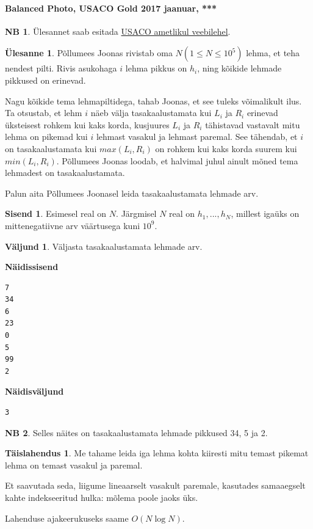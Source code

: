 \documentclass{trkut}
\theoremstyle{definition}
\newtheorem*{extra}{NB}
\newtheorem*{solution}{Täislahendus}
\newtheorem*{Input}{Sisend}
\newtheorem*{Output}{Väljund}
\newtheorem*{Text}{Ülesanne}
\begin{document}
\paragraph{Balanced Photo, USACO Gold 2017 jaanuar, ***}
\begin{extra}
Ülesannet saab esitada \href{http://www.usaco.org/index.php?page=viewproblem2&cpid=693}{USACO ametlikul veebilehel}.
\end{extra}
\begin{Text}
Põllumees Joonas rivistab oma $N$$(1\le N\le 10^5)$ lehma, et teha nendest pilti. Rivis asukohaga $i$ lehma pikkus on $h_i$, ning kõikide lehmade pikkused on erinevad.

Nagu kõikide tema lehmapiltidega, tahab Joonas, et see tuleks võimalikult ilus. Ta otsustab, et lehm $i$ näeb välja tasakaalustamata kui $L_i$ ja $R_i$ erinevad üksteisest rohkem kui kaks korda, kusjuures $L_i$ ja $R_i$ tähistavad vastavalt mitu lehma on pikemad kui $i$  lehmast vasakul ja lehmast paremal. See tähendab, et $i$ on tasakaalustamata kui $max(L_i,R_i)$ on rohkem kui kaks korda suurem kui $min(L_i, R_i)$.  Põllumees Joonas loodab, et halvimal juhul ainult mõned tema lehmadest on tasakaalustamata.

Palun aita Põllumees Joonasel leida tasakaalustamata lehmade arv.

\parencite{25}
\end{Text}
\begin{Input}
Esimesel real on $N$. Järgmisel $N$ real on $h_1,...,h_N$, millest igaüks on mittenegatiivne arv väärtusega kuni $10^9$.
\end{Input}
\begin{Output}
Väljasta tasakaalustamata lehmade arv.
\end{Output}

\textbf{Näidissisend}

\begin{verbatim}
7
34
6
23
0
5
99
2
\end{verbatim}

\textbf{Näidisväljund}

\begin{verbatim}
3
\end{verbatim}

\begin{extra}
Selles näites on tasakaalustamata lehmade pikkused 34, 5 ja 2.
\end{extra}

\begin{solution}
Me tahame leida iga lehma kohta kiiresti mitu temast pikemat lehma on temast vasakul ja paremal.

Et saavutada seda, liigume lineaarselt vasakult paremale, kasutades samaaegselt kahte indekseeritud hulka: mõlema poole jaoks üks.

Lahenduse ajakeerukuseks saame $O(N\log N)$.
\end{solution}
\end{document}
